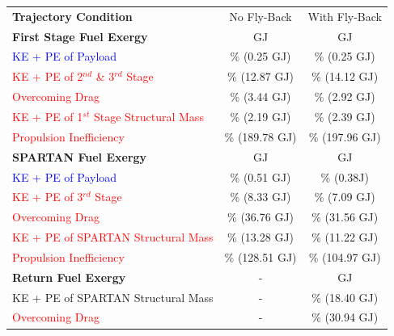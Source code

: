 \begin{table}[ht]
	\centering
	\begin{tabular}{l c c} 
		\hline \textbf{Trajectory Condition}
		& No Fly-Back
		& With Fly-Back
		\\
		\textbf{First Stage Fuel Exergy} 
		&\textbf{\firstEnergyStandardNoReturn} GJ
		&\textbf{\firstEnergyStandard} GJ
		\\
		
		\textcolor{blue}{KE + PE of Payload}
		& \firstWpayloadStandardNoReturn \% (0.25 GJ)
		& \firstWpayloadStandard \% (0.25 GJ)
		\\
		\textcolor{red}{KE + PE of  2$^{nd}$ \& 3$^{rd}$ Stage}
		& \firstWnextStageStandardNoReturn \% (12.87 GJ) & \firstWnextStageStandard \% (14.12 GJ)
		\\
		\textcolor{red}{Overcoming Drag} 
		& \WDoneStandardNoReturn \% (3.44 GJ) & \WDoneStandard \% (2.92 GJ)
		\\
		\textcolor{red}{KE + PE of 1$^{st}$ Stage Structural Mass} 
		& \WoneStandardNoReturn \% (2.19 GJ) & \WoneStandard \% (2.39 GJ)
		\\
		
		
		\textcolor{red}{Propulsion Inefficiency} 
		& \PlossoneCombinedStandardNoReturn \% (189.78 GJ) & \PlossoneCombinedStandard \% (197.96 GJ)
		\\ 
		\textbf{SPARTAN Fuel Exergy} 
		& \textbf{\secondEnergyStandardNoReturn} GJ & \textbf{\secondEnergyStandard} GJ
		\\
		\textcolor{blue}{KE + PE of Payload}
		& \secondWpayloadStandardNoReturn \% (0.51 GJ) & \secondWpayloadStandard \% (0.38J)
		\\
		\textcolor{red}{KE + PE of 3$^{rd}$ Stage}
		& \secondWnextStageStandardNoReturn \% (8.33 GJ) & \secondWnextStageStandard \% (7.09 GJ)
		\\
		\textcolor{red}{Overcoming Drag}
		& \WDsecondStandardNoReturn \% (36.76 GJ) & \WDsecondStandard \% (31.56 GJ)
		\\
		\textcolor{red}{KE + PE of SPARTAN Structural Mass}  
		& \WsecondStandardNoReturn \% (13.28 GJ) & \WsecondStandard \% (11.22 GJ)
		\\
		\textcolor{red}{Propulsion Inefficiency}  
		& \PlosssecondCombinedStandardNoReturn \% (128.51 GJ) & \PlosssecondCombinedStandard \% (104.97 GJ)
		\\
		
		
		
		\textbf{Return Fuel Exergy} 
		& - & \textbf{\returnEnergyStandard} GJ
		\\
		KE + PE of SPARTAN Structural Mass
		& - & \WreturnStandard \% (18.40 GJ)
		\\
		\textcolor{red}{Overcoming Drag}
		& - & \WDreturnStandard \% (30.94 GJ)
		\\
		

\end{tabular}
\end{table}
